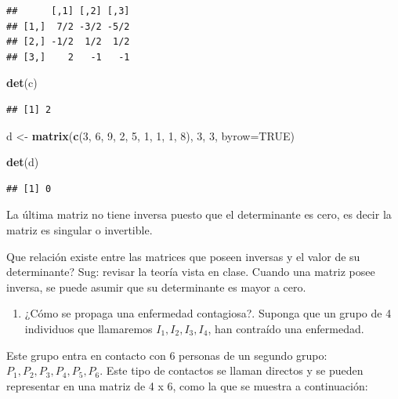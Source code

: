 \documentclass[]{article}
\newenvironment{Shaded}{\begin{snugshade}}{\end{snugshade}}
\newcommand{\DataTypeTok}[1]{\textcolor[rgb]{0.13,0.29,0.53}{#1}}
\newcommand{\DecValTok}[1]{\textcolor[rgb]{0.00,0.00,0.81}{#1}}
\newcommand{\KeywordTok}[1]{\textcolor[rgb]{0.13,0.29,0.53}{\textbf{#1}}}
\newcommand{\NormalTok}[1]{#1}
\newcommand{\OtherTok}[1]{\textcolor[rgb]{0.56,0.35,0.01}{#1}}
\newcommand{\StringTok}[1]{\textcolor[rgb]{0.31,0.60,0.02}{#1}}
\providecommand{\tightlist}{%
  \setlength{\itemsep}{0pt}\setlength{\parskip}{0pt}}
\begin{document}
\begin{verbatim}
##      [,1] [,2] [,3]
## [1,]  7/2 -3/2 -5/2
## [2,] -1/2  1/2  1/2
## [3,]    2   -1   -1
\end{verbatim}

\begin{Shaded}
\begin{Highlighting}[]
\KeywordTok{det}\NormalTok{(c)}
\end{Highlighting}
\end{Shaded}

\begin{verbatim}
## [1] 2
\end{verbatim}

\begin{Shaded}
\begin{Highlighting}[]
\NormalTok{d <-}\StringTok{ }\KeywordTok{matrix}\NormalTok{(}\KeywordTok{c}\NormalTok{(}\DecValTok{3}\NormalTok{, }\DecValTok{6}\NormalTok{, }\DecValTok{9}\NormalTok{, }
              \DecValTok{2}\NormalTok{, }\DecValTok{5}\NormalTok{, }\DecValTok{1}\NormalTok{,}
              \DecValTok{1}\NormalTok{, }\DecValTok{1}\NormalTok{, }\DecValTok{8}\NormalTok{), }
              \DecValTok{3}\NormalTok{, }\DecValTok{3}\NormalTok{, }\DataTypeTok{byrow=}\OtherTok{TRUE}\NormalTok{)}

\KeywordTok{det}\NormalTok{(d)}
\end{Highlighting}
\end{Shaded}

\begin{verbatim}
## [1] 0
\end{verbatim}

La última matriz no tiene inversa puesto que el determinante es cero, es
decir la matriz es singular o invertible.

Que relación existe entre las matrices que poseen inversas y el valor de
su determinante? Sug: revisar la teoría vista en clase. Cuando una
matriz posee inversa, se puede asumir que su determinante es mayor a
cero.

\begin{enumerate}
\def\labelenumi{\arabic{enumi}.}
\setcounter{enumi}{4}
\tightlist
\item
  ¿Cómo se propaga una enfermedad contagiosa?. Suponga que un grupo de 4
  individuos que llamaremos \(I_{1}, I_{2}, I_{3}, I_{4}\), han
  contraído una enfermedad.
\end{enumerate}

Este grupo entra en contacto con 6 personas de un segundo grupo:
\(P_{1}, P_{2}, P_{3}, P_{4}, P_{5}, P_{6}\). Este tipo de contactos se
llaman directos y se pueden representar en una matriz de 4 x 6, como la
que se muestra a continuación:
\end{document}
